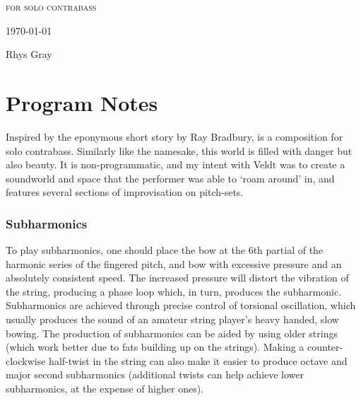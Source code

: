 
\invisiblechapter{\bassPiece}

\vspace{3.8cm}

\begin{center}

\textsc{for solo contrabass}

\vspace{2.8cm}

\HRule{0.5pt}

\LARGE \textbf{\uppercase{\bassPiece}}

\HRule{2pt}

\vspace{1.8cm}

\normalsize \today

\vspace{3.8cm}

Rhys Gray

\end{center}
\newpage

\section*{Program Notes}
Inspired by the eponymous short story by Ray Bradbury, \bassPiece  is a composition for solo contrabass. 
Similarly like the namesake, this world is filled with danger but also beauty. 
It is non-programmatic, and my intent with Veldt was to create a soundworld and space that the performer was able to `roam around' in, and features several sections of improvisation on pitch-sets.

\subsubsection*{Subharmonics}
To play subharmonics, one should place the bow at the 6th partial of the harmonic series of the fingered pitch, and bow with excessive pressure and an absolutely consistent speed. 
The increased pressure will distort the vibration of the string, producing a phase loop which, in turn, produces the subharmonic. 
Subharmonics are achieved through precise control of torsional oscillation, which usually produces the sound of an amateur string player's heavy handed, slow bowing. 
The production of subharmonics can be aided by using older strings (which work better due to fats building up on the strings). 
Making a counter-clockwise half-twist in the string can also make it easier to produce octave and major second subharmonics (additional twists can help achieve lower subharmonics, at the expense of higher ones).

